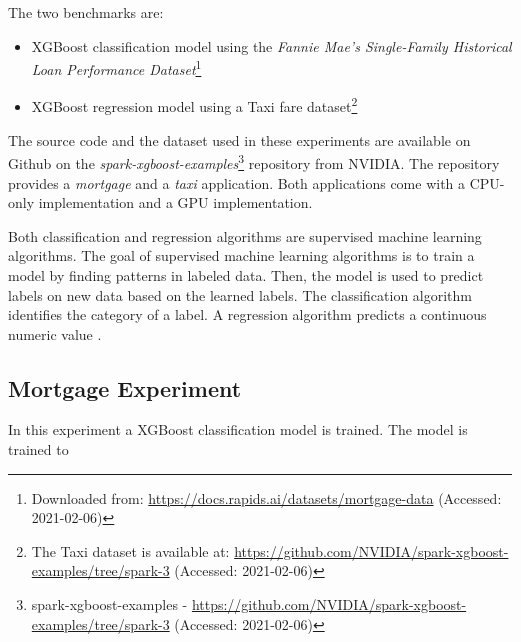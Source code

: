 The two benchmarks are:
\begin{itemize}
\item XGBoost classification model using the \textit{Fannie Mae’s Single-Family Historical Loan Performance Dataset}\footnote{Downloaded from: \url{https://docs.rapids.ai/datasets/mortgage-data} (Accessed: 2021-02-06)}\cite{Fannie2021Mortgage}

\item XGBoost regression model using a Taxi fare dataset\footnote{The Taxi dataset is available at: \url{https://github.com/NVIDIA/spark-xgboost-examples/tree/spark-3} (Accessed: 2021-02-06)}
\end{itemize}
The source code and the dataset used in these experiments are available on Github on the \textit{spark-xgboost-examples}\footnote{spark-xgboost-examples - \url{https://github.com/NVIDIA/spark-xgboost-examples/tree/spark-3} (Accessed: 2021-02-06)} repository from NVIDIA.
The repository provides a \textit{mortgage} and a \textit{taxi} application. Both applications come with a CPU-only implementation and a GPU implementation.

Both classification and regression algorithms are supervised machine learning algorithms.
The goal of supervised machine learning algorithms is to train a model by finding patterns in labeled data. Then, the model is used to predict labels on new data based on the learned labels.
The classification algorithm identifies the category of a label.
A regression algorithm predicts a continuous numeric value \cite{Mcdonald2020SparkRapids}.


\subsection{Mortgage Experiment}
In this experiment a XGBoost classification model is trained.
The model is trained to 





